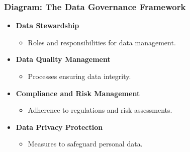 \documentclass[aspectratio=169]{beamer}
\begin{document}
\begin{frame}[fragile]
    \frametitle{Diagram: The Data Governance Framework}
    \begin{itemize}
        \item \textbf{Data Stewardship}
        \begin{itemize}
            \item Roles and responsibilities for data management.
        \end{itemize}

        \item \textbf{Data Quality Management}
        \begin{itemize}
            \item Processes ensuring data integrity.
        \end{itemize}

        \item \textbf{Compliance and Risk Management}
        \begin{itemize}
            \item Adherence to regulations and risk assessments.
        \end{itemize}

        \item \textbf{Data Privacy Protection}
        \begin{itemize}
            \item Measures to safeguard personal data.
        \end{itemize}
    \end{itemize}
\end{frame}
\end{document}
